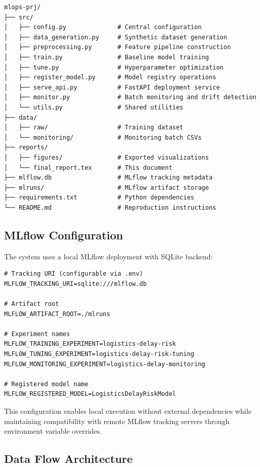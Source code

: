 \documentclass[11pt,a4paper]{article}
\begin{document}
\begin{lstlisting}[style=shell]
mlops-prj/
├── src/
│   ├── config.py              # Central configuration
│   ├── data_generation.py     # Synthetic dataset generation
│   ├── preprocessing.py       # Feature pipeline construction
│   ├── train.py               # Baseline model training
│   ├── tune.py                # Hyperparameter optimization
│   ├── register_model.py      # Model registry operations
│   ├── serve_api.py           # FastAPI deployment service
│   ├── monitor.py             # Batch monitoring and drift detection
│   └── utils.py               # Shared utilities
├── data/
│   ├── raw/                   # Training dataset
│   └── monitoring/            # Monitoring batch CSVs
├── reports/
│   ├── figures/               # Exported visualizations
│   └── final_report.tex       # This document
├── mlflow.db                  # MLflow tracking metadata
├── mlruns/                    # MLflow artifact storage
├── requirements.txt           # Python dependencies
└── README.md                  # Reproduction instructions
\end{lstlisting}

\subsection{MLflow Configuration}

The system uses a local MLflow deployment with SQLite backend:

\begin{lstlisting}[style=shell]
# Tracking URI (configurable via .env)
MLFLOW_TRACKING_URI=sqlite:///mlflow.db

# Artifact root
MLFLOW_ARTIFACT_ROOT=./mlruns

# Experiment names
MLFLOW_TRAINING_EXPERIMENT=logistics-delay-risk
MLFLOW_TUNING_EXPERIMENT=logistics-delay-risk-tuning
MLFLOW_MONITORING_EXPERIMENT=logistics-delay-monitoring

# Registered model name
MLFLOW_REGISTERED_MODEL=LogisticsDelayRiskModel
\end{lstlisting}

This configuration enables local execution without external dependencies while maintaining compatibility with remote MLflow tracking servers through environment variable overrides.

\subsection{Data Flow Architecture}
\end{document}
